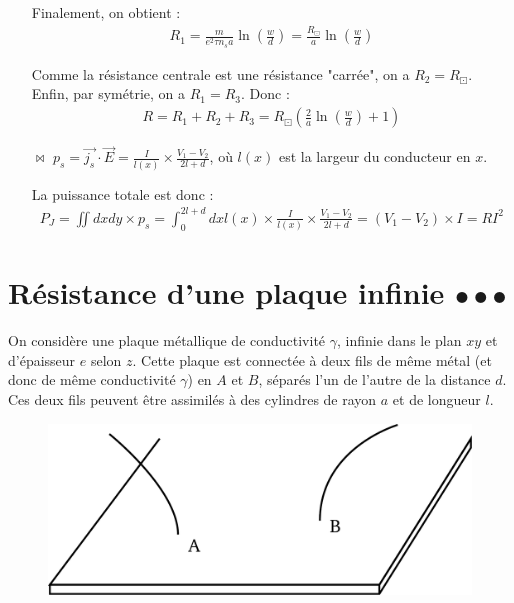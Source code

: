 \documentclass{report}
\begin{document}
\begin{itemize}
	Finalement, on obtient :
	\begin{align*}
		R_1=\frac{m}{e^2\tau n_sa}\ln\left(\frac{w}{d} \right) =\frac{R_\boxdot}{a}\ln\left(\frac{w}{d} \right)
	\end{align*}
	
	Comme la résistance centrale est une résistance "carrée", on a $R_2=R_\boxdot$. Enfin, par symétrie, on a $R_1=R_3$. Donc :
	\begin{align*}
		R = R_1+R_2+R_3 = R_\boxdot\left(\frac{2}{a}\ln\left(\frac{w}{d} \right)+1 \right) 
	\end{align*}
	
	
	\item[$\bowtie$] $p_s=\vec{j_s}\cdot\vec{E}=\frac{I}{l(x)}\times\frac{V_1-V_2}{2l+d}$, où $l(x)$ est la largeur du conducteur en $x$. 
	
	La puissance totale est donc :
	\begin{align*}
	P_J = \iint dx dy\times p_s = \int_{0}^{2l+d} dx l(x)\times\frac{I}{l(x)}\times\frac{V_1-V_2}{2l+d} = (V_1-V_2)\times I= RI^2
	\end{align*}

\end{itemize}

\newpage

\section*{Résistance d'une plaque infinie $\bullet\bullet\bullet$}

On considère une plaque métallique de conductivité $\gamma$, infinie dans le plan $xy$ et d'épaisseur $e$ selon $z$. Cette plaque est connectée à deux fils de même métal (et donc de même conductivité $\gamma$) en $A$ et $B$, séparés l'un de l'autre de la distance $d$. Ces deux fils peuvent être assimilés à des cylindres de rayon $a$ et de longueur $l$. 

\begin{figure}[h!]
\centering
		\includegraphics[scale=0.3]{plaque.pdf}
\end{figure}
\end{document}

